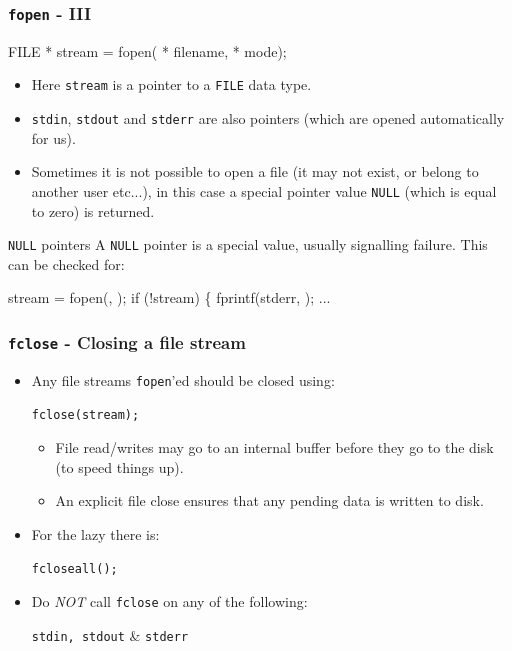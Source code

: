 \documentclass[smaller,handout,table]{beamer}
\begin{document}
\begin{frame}[fragile]
\frametitle{{\tt fopen} - III}
\begin{semiverbatim}
\small
FILE * stream = fopen( * filename,  * mode);
\end{semiverbatim}
\vspace{-0.1in}
\begin{itemize}
\item Here {\tt stream} is a pointer to a {\tt FILE} data type.
\item {\tt stdin}, {\tt stdout} and {\tt stderr} are also pointers (which are opened automatically for us).
\item Sometimes it is not possible to open a file (it may not exist, or belong to another user etc...), in this case a special pointer value {\tt NULL} (which is equal to zero) is returned.
\end{itemize}

\begin{block}{{\tt NULL} pointers}
A {\tt NULL} pointer is a special value, usually signalling failure. This can be checked for:
\vspace{-0.2in}
\begin{semiverbatim}
\footnotesize
stream = fopen(, );
if (!stream)
\{
   fprintf(stderr, );
   ...
\end{semiverbatim}
\end{block}
\end{frame}

\begin{frame}
\frametitle{{\tt fclose} - Closing a file stream}
\begin{itemize}
\item Any file streams {\tt fopen}'ed should be closed using:
\begin{center}
\tt fclose(stream);
\end{center}
\begin{itemize}
\item File read/writes may go to an internal buffer before they go to the disk (to speed things up).
\item An explicit file close ensures that any pending data is written to disk.
\end{itemize}
\item For the lazy there is:
\begin{center}
\tt fcloseall();
\end{center}
\item Do \emph{NOT} call {\tt fclose} on any of the following:
\begin{center}
{\tt stdin, stdout} \& \tt stderr
\end{center}
\end{itemize}
\end{frame}
\end{document}
